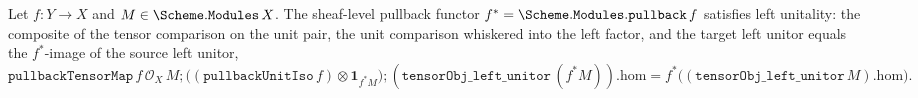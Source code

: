 \begin{lemma}\label{mk-lem:pullback_tensor_map_left_unitality}
  \leanok

  Let \(f : Y \to X\) and \(M \in \Scheme.\mathtt{Modules}\,X\). The sheaf-level pullback functor
  \(f^{*} = \Scheme.\mathtt{Modules.pullback}\,f\) satisfies left unitality: the composite of the
  tensor comparison on the unit pair, the unit comparison whiskered into the left factor, and the
  target left unitor equals the \(f^{*}\)-image of the source left unitor,
  \[
    \mathtt{pullbackTensorMap}\,f\,\mathcal{O}_X\,M
      \mathbin{;} \bigl((\mathtt{pullbackUnitIso}\,f) \otimes \mathbf 1_{f^{*}M}\bigr)
      \mathbin{;} (\mathtt{tensorObj\_left\_unitor}\,(f^{*}M)).\mathrm{hom}
    = f^{*}\bigl((\mathtt{tensorObj\_left\_unitor}\,M).\mathrm{hom}\bigr).
  \]
\end{lemma}

